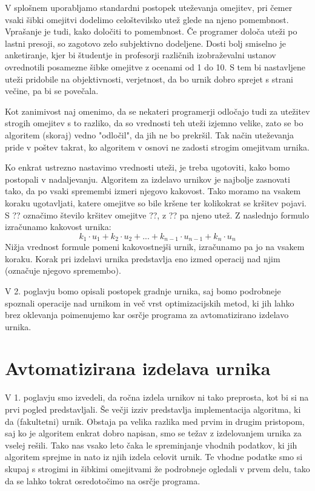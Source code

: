 \documentclass[a4paper,10pt]{article}
\begin{document}
   V splošnem uporabljamo standardni postopek uteževanja omejitev, pri čemer vsaki šibki
   omejitvi dodelimo celoštevilsko utež glede na njeno pomembnost. Vprašanje je tudi, kako
   določiti to pomembnost. Če programer določa uteži po lastni presoji, so zagotovo zelo
   subjektivno dodeljene. Dosti bolj smiselno je anketiranje, kjer bi študentje in profesorji
   različnih izobraževalni ustanov ovrednotili posamezne šibke omejitve z ocenami od 1 do 10.
   S tem bi nastavljene uteži pridobile na objektivnosti, verjetnost, da bo urnik dobro
   sprejet s strani večine, pa bi se povečala.
   
   Kot zanimivost naj omenimo, da se nekateri programerji odločajo tudi za utežitev strogih
   omejitev s to razliko, da so vrednosti teh uteži izjemno velike, zato se bo algoritem
   (skoraj) vedno "odločil", da jih ne bo prekršil. Tak način uteževanja pride v poštev
   takrat, ko algoritem v osnovi ne zadosti strogim omejitvam urnika.
   
   Ko enkrat ustrezno nastavimo vrednosti uteži, je treba ugotoviti, kako bomo postopali
   v nadaljevanju. Algoritem za izdelavo urnikov je najbolje zasnovati tako, da po vsaki
   spremembi izmeri njegovo kakovost. Tako moramo na vsakem koraku ugotavljati, katere
   omejitve so bile kršene ter kolikokrat se kršitev pojavi. S ?? označimo število
   kršitev omejitve ??, z ?? pa njeno utež. Z naslednjo formulo izračunamo
   kakovost urnika:
   \[k_1 \cdot u_1 + k_2 \cdot u_2 + . . . + k_{n-1} \cdot u_{n-1} + k_n \cdot u_n \]
   Nižja vrednost formule pomeni kakovostnejši urnik, izračunamo pa jo na vsakem koraku.
   Korak pri izdelavi urnika predstavlja eno izmed operacij nad njim (označuje njegovo
   spremembo).
   
   V 2. poglavju bomo opisali postopek gradnje urnika, saj bomo podrobneje spoznali
   operacije nad urnikom in več vrst optimizacijskih metod, ki jih lahko brez oklevanja
   poimenujemo kar osrčje programa za avtomatizirano izdelavo urnika.
   
   \section{Avtomatizirana izdelava urnika}
   
   V 1. poglavju smo izvedeli, da ročna izdela urnikov ni tako preprosta, kot bi si
   na prvi pogled predstavljali. Še večji izziv predstavlja implementacija algoritma, ki da
   (fakultetni) urnik. Obstaja pa velika razlika med prvim in drugim pristopom, saj ko je
   algoritem enkrat dobro napisan, smo se težav z izdelovanjem urnika za vselej rešili.
   Tako nas vsako leto čaka le spreminjanje vhodnih podatkov, ki jih algoritem sprejme in
   nato iz njih izdela celovit urnik. Te vhodne podatke smo si skupaj s strogimi in šibkimi
   omejitvami že podrobneje ogledali v prvem delu, tako da se lahko tokrat osredotočimo na
   osrčje programa.
   
\end{document}

